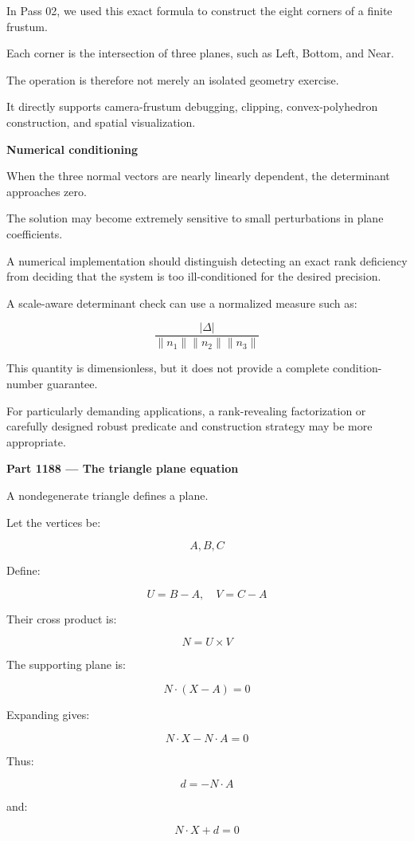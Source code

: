 In Pass 02, we used this exact formula to construct the eight corners of a finite frustum.

Each corner is the intersection of three planes, such as Left, Bottom, and Near.

The operation is therefore not merely an isolated geometry exercise.

It directly supports camera-frustum debugging, clipping, convex-polyhedron construction, and spatial visualization.

\textbf{Numerical conditioning}

When the three normal vectors are nearly linearly dependent, the determinant approaches zero.

The solution may become extremely sensitive to small perturbations in plane coefficients.

A numerical implementation should distinguish detecting an exact rank deficiency from deciding that the system is too ill-conditioned for the desired precision.

A scale-aware determinant check can use a normalized measure such as:

\[
\frac{|\Delta|} {\|n_1\|\|n_2\|\|n_3\|}
\]

This quantity is dimensionless, but it does not provide a complete condition-number guarantee.

For particularly demanding applications, a rank-revealing factorization or carefully designed robust predicate and construction strategy may be more appropriate.

\textbf{Part 1188 --- The triangle plane equation}

A nondegenerate triangle defines a plane.

Let the vertices be:

\[
A,B,C
\]

Define:

\[
U=B-A,\quad V=C-A
\]

Their cross product is:

\[
N=U\times V
\]

The supporting plane is:

\[
\boxed{ N\cdot(X-A)=0 }
\]

Expanding gives:

\[
\boxed{ N\cdot X-N\cdot A=0 }
\]

Thus:

\[
d=-N\cdot A
\]

and:

\[
\boxed{ N\cdot X+d=0 }
\]

